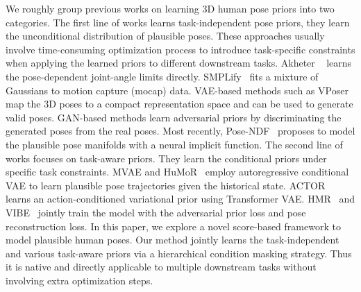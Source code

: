 \documentclass[10pt,twocolumn,letterpaper]{article}
\begin{document}
We roughly group previous works on learning 3D human pose priors into two categories. The first line of works learns task-independent pose priors, \ie they learn the unconditional distribution  of plausible poses. These approaches usually involve time-consuming optimization process to introduce task-specific constraints when applying the learned priors to different downstream tasks. Akheter \etal~\cite{akhter2015pose} learns the pose-dependent joint-angle limits directly. SMPLify~\cite{bogo2016keep} fits a mixture of Gaussians to motion capture (mocap) data. VAE-based methods such as VPoser~\cite{pavlakos2019expressive} map the 3D poses to a compact representation space and can be used to generate valid poses. GAN-based methods\cite{davydov2022adversarial} learn adversarial priors by discriminating the generated poses from the real poses. Most recently, Pose-NDF~\cite{tiwari2022pose} proposes to model the plausible pose manifolds with a neural implicit function. 
The second line of works focuses on task-aware priors. They learn the conditional priors  under specific task constraints. MVAE\cite{ling2020character} and HuMoR~\cite{rempe2021humor} employ autoregressive conditional VAE to learn plausible pose trajectories given the historical state. ACTOR~\cite{petrovich21actor} learns an action-conditioned variational prior using Transformer VAE.
HMR~\cite{hmrKanazawa17} and VIBE~\cite{kocabas2019vibe} jointly train the model with the adversarial prior loss and pose reconstruction loss.
In this paper, we explore a novel score-based framework to model plausible human poses. Our method jointly learns the task-independent and various task-aware priors via a hierarchical condition masking strategy. Thus it is native and directly applicable to multiple downstream tasks without involving extra optimization steps.
\end{document}
